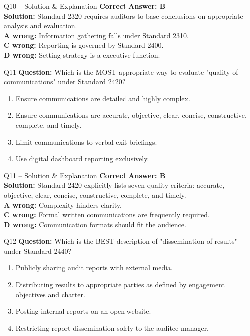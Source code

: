 \documentclass[aspectratio=169,10pt]{beamer}
\begin{document}
	\begin{frame}[t]{Q10 -- Solution \& Explanation}
		\small
		\textbf{Correct Answer: B} \\[4pt]
		\textbf{Solution:} Standard 2320 requires auditors to base conclusions on appropriate analysis and evaluation. \\[4pt]
		\textbf{A wrong:} Information gathering falls under Standard 2310. \\[2pt]
		\textbf{C wrong:} Reporting is governed by Standard 2400. \\[2pt]
		\textbf{D wrong:} Setting strategy is a executive function.
	\end{frame}
	
	\begin{frame}[t]{Q11}
		\small
		\textbf{Question:} Which is the MOST appropriate way to evaluate "quality of communications" under Standard 2420?
		\begin{enumerate}[label=\Alph*.,itemsep=1pt,topsep=2pt]
			\item Ensure communications are detailed and highly complex.
			\item Ensure communications are accurate, objective, clear, concise, constructive, complete, and timely.
			\item Limit communications to verbal exit briefings.
			\item Use digital dashboard reporting exclusively.
		\end{enumerate}
	\end{frame}
	
	\begin{frame}[t]{Q11 -- Solution \& Explanation}
		\small
		\textbf{Correct Answer: B} \\[4pt]
		\textbf{Solution:} Standard 2420 explicitly lists seven quality criteria: accurate, objective, clear, concise, constructive, complete, and timely. \\[4pt]
		\textbf{A wrong:} Complexity hinders clarity. \\[2pt]
		\textbf{C wrong:} Formal written communications are frequently required. \\[2pt]
		\textbf{D wrong:} Communication formats should fit the audience.
	\end{frame}
	
	\begin{frame}[t]{Q12}
		\small
		\textbf{Question:} Which is the BEST description of "dissemination of results" under Standard 2440?
		\begin{enumerate}[label=\Alph*.,itemsep=1pt,topsep=2pt]
			\item Publicly sharing audit reports with external media.
			\item Distributing results to appropriate parties as defined by engagement objectives and charter.
			\item Posting internal reports on an open website.
			\item Restricting report dissemination solely to the auditee manager.
		\end{enumerate}
	\end{frame}
	
\end{document}
